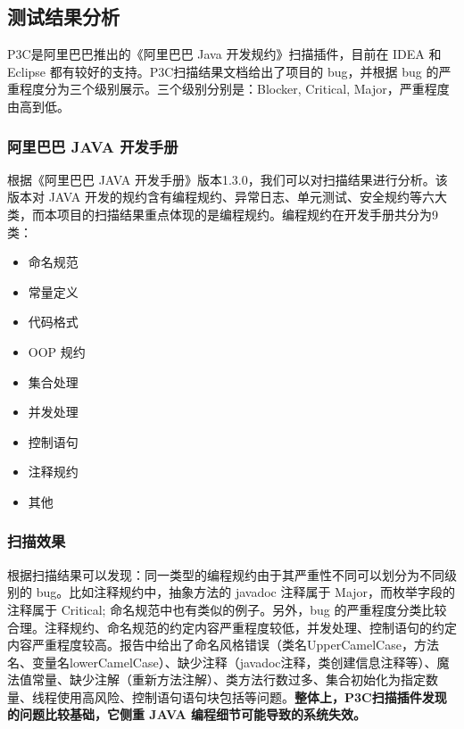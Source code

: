 \documentclass[hyperref, a4paper]{ctexart}
\providecommand{\tightlist}{%
  \setlength{\itemsep}{0pt}\setlength{\parskip}{0pt}}
\begin{document}
\hypertarget{ux6d4bux8bd5ux7ed3ux679cux5206ux6790-1}{%
\subsection{测试结果分析}\label{ux6d4bux8bd5ux7ed3ux679cux5206ux6790-1}}

P3C是阿里巴巴推出的《阿里巴巴 Java 开发规约》扫描插件，目前在 IDEA 和
Eclipse 都有较好的支持。P3C扫描结果文档给出了项目的 bug，并根据 bug
的严重程度分为三个级别展示。三个级别分别是：Blocker, Critical,
Major，严重程度由高到低。

\hypertarget{ux963fux91ccux5df4ux5df4-java-ux5f00ux53d1ux624bux518c}{%
\subsubsection{阿里巴巴 JAVA
开发手册}\label{ux963fux91ccux5df4ux5df4-java-ux5f00ux53d1ux624bux518c}}

根据《阿里巴巴 JAVA
开发手册》版本1.3.0，我们可以对扫描结果进行分析。该版本对 JAVA
开发的规约含有编程规约、异常日志、单元测试、安全规约等六大类，而本项目的扫描结果重点体现的是编程规约。编程规约在开发手册共分为9类：

\begin{itemize}
\tightlist
\item
  命名规范
\item
  常量定义
\item
  代码格式
\item
  OOP 规约
\item
  集合处理
\item
  并发处理
\item
  控制语句
\item
  注释规约
\item
  其他
\end{itemize}

\hypertarget{ux626bux63cfux6548ux679c-1}{%
\subsubsection{扫描效果}\label{ux626bux63cfux6548ux679c-1}}

根据扫描结果可以发现：同一类型的编程规约由于其严重性不同可以划分为不同级别的
bug。比如注释规约中，抽象方法的 javadoc 注释属于
Major，而枚举字段的注释属于 Critical;
命名规范中也有类似的例子。另外，bug
的严重程度分类比较合理。注释规约、命名规范的约定内容严重程度较低，并发处理、控制语句的约定内容严重程度较高。报告中给出了命名风格错误（类名UpperCamelCase，方法名、变量名lowerCamelCase）、缺少注释（javadoc注释，类创建信息注释等）、魔法值常量、缺少注解（重新方法注解）、类方法行数过多、集合初始化为指定数量、线程使用高风险、控制语句语句块包括等问题。\textbf{整体上，P3C扫描插件发现的问题比较基础，它侧重
JAVA 编程细节可能导致的系统失效。}
\end{document}
